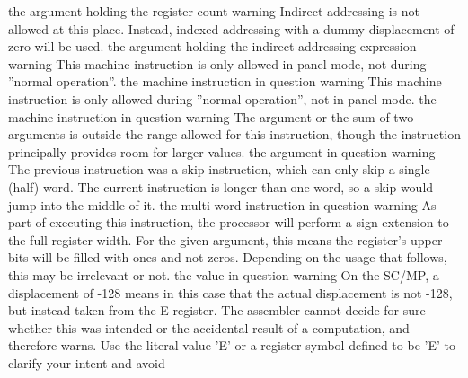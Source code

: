 \documentclass[12pt,twoside]{report}
\begin{document}
\begin{description}
               {the argument holding the register count}
               {warning}
               {Indirect addressing is not allowed at this place.
                Instead, indexed addressing with a dummy displacement of
                zero will be used.}
               {the argument holding the indirect addressing expression}
               {warning}
               {This machine instruction is only allowed in panel mode,
                not during ''normal operation''.}
               {the machine instruction in question}
               {warning}
               {This machine instruction is only allowed during ''normal
                operation'', not in panel mode.}
               {the machine instruction in question}
               {warning}
               {The argument or the sum of two arguments is outside the
                range allowed for this instruction, though the instruction
                principally provides room for larger values.}
               {the argument in question}
               {warning}
               {The previous instruction was a skip instruction, which
                can only skip a single (half) word.  The current instruction
                is longer than one word, so a skip would jump into the middle
                of it.}
               {the multi-word instruction in question}
               {warning}
               {As part of executing this instruction, the processor will
                perform a sign extension to the full register width.  For the
                given argument, this means the register's upper bits will be
                filled with ones and not zeros.  Depending on the usage that
                follows, this may be irrelevant or not.}
               {the value in question}
               {warning}
               {On the SC/MP, a displacement of -128 means in this case that
                the actual displacement is not -128, but instead taken from
                the E register.  The assembler cannot decide for sure whether
                this was intended or the accidental result of a computation,
                and therefore warns.  Use the literal value 'E' or a register
                symbol defined to be 'E' to clarify your intent and avoid
}
\end{description}
\end{document}
